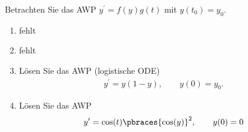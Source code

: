 \begin{exercise}
    Betrachten Sie das AWP $y^\prime = f(y)g(t)$ mit $y(t_0) = y_0$. 
    \begin{enumerate}[label = \alph*)]
        \item fehlt
        \item fehlt
        \item Lösen Sie das AWP (logistische ODE)
        \begin{align*}
            y^\prime = y(1 - y), \qquad y(0) = y_0.
        \end{align*}
        \item Lösen Sie das AWP
        \begin{align*}
            y^\prime = \cos(t) \pbraces{\cos(y)}^2, \qquad y(0) = 0
        \end{align*}
    \end{enumerate}
\end{exercise}
